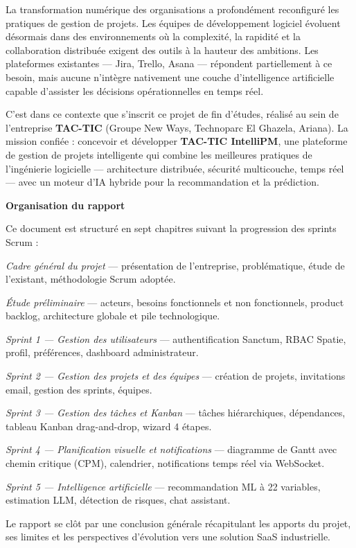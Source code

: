La transformation numérique des organisations a profondément reconfiguré les pratiques
de gestion de projets. Les équipes de développement logiciel évoluent désormais dans
des environnements où la complexité, la rapidité et la collaboration distribuée exigent
des outils à la hauteur des ambitions. Les plateformes existantes — Jira, Trello,
Asana — répondent partiellement à ce besoin, mais aucune n'intègre nativement une
couche d'intelligence artificielle capable d'assister les décisions opérationnelles en
temps réel.

\bigskip
C'est dans ce contexte que s'inscrit ce projet de fin d'études, réalisé au sein de
l'entreprise \textbf{TAC-TIC} (Groupe New Ways, Technoparc El Ghazela, Ariana).
La mission confiée : concevoir et développer \textbf{TAC-TIC IntelliPM}, une plateforme
de gestion de projets intelligente qui combine les meilleures pratiques de l'ingénierie
logicielle — architecture distribuée, sécurité multicouche, temps réel — avec un moteur
d'IA hybride pour la recommandation et la prédiction.

\bigskip
\noindent\textbf{Organisation du rapport}

\medskip
Ce document est structuré en sept chapitres suivant la progression des sprints Scrum :

\begin{description}[leftmargin=3cm,style=nextline]
  \item[Chapitre 1] \textit{Cadre général du projet} — présentation de l'entreprise,
        problématique, étude de l'existant, méthodologie Scrum adoptée.

  \item[Chapitre 2] \textit{Étude préliminaire} — acteurs, besoins fonctionnels et
        non fonctionnels, product backlog, architecture globale et pile technologique.

  \item[Chapitre 3] \textit{Sprint 1 — Gestion des utilisateurs} — authentification
        Sanctum, RBAC Spatie, profil, préférences, dashboard administrateur.

  \item[Chapitre 4] \textit{Sprint 2 — Gestion des projets et des équipes} —
        création de projets, invitations email, gestion des sprints, équipes.

  \item[Chapitre 5] \textit{Sprint 3 — Gestion des tâches et Kanban} — tâches
        hiérarchiques, dépendances, tableau Kanban drag-and-drop, wizard 4 étapes.

  \item[Chapitre 6] \textit{Sprint 4 — Planification visuelle et notifications} —
        diagramme de Gantt avec chemin critique (CPM), calendrier, notifications
        temps réel via WebSocket.

  \item[Chapitre 7] \textit{Sprint 5 — Intelligence artificielle} — recommandation
        ML à 22 variables, estimation LLM, détection de risques, chat assistant.
\end{description}

\medskip
Le rapport se clôt par une conclusion générale récapitulant les apports du projet,
ses limites et les perspectives d'évolution vers une solution SaaS industrielle.
